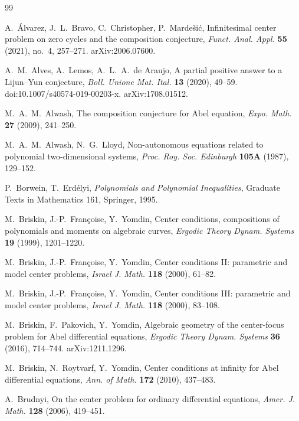 \documentclass[11pt]{article}
\theoremstyle{plain}
\theoremstyle{definition}
\theoremstyle{remark}
\begin{document}
\begin{thebibliography}{99}

A.~Álvarez, J.~L.~Bravo, C.~Christopher, P.~Mardešić,
Infinitesimal center problem on zero cycles and the composition conjecture,
\emph{Funct. Anal. Appl.} \textbf{55} (2021), no.~4, 257--271.
arXiv:2006.07600.

A.~M.~Alves, A.~Lemos, A.~L.~A.~de Araujo,
A partial positive answer to a Lijun--Yun conjecture,
\emph{Boll. Unione Mat. Ital.} \textbf{13} (2020), 49--59.
doi:10.1007/s40574-019-00203-x. arXiv:1708.01512.

M.~A.~M.~Alwash,
The composition conjecture for Abel equation,
\emph{Expo. Math.} \textbf{27} (2009), 241--250.

M.~A.~M.~Alwash, N.~G.~Lloyd,
Non-autonomous equations related to polynomial two-dimensional systems,
\emph{Proc. Roy. Soc. Edinburgh} \textbf{105A} (1987), 129--152.

P.~Borwein, T.~Erdélyi,
\emph{Polynomials and Polynomial Inequalities},
Graduate Texts in Mathematics 161, Springer, 1995.

M.~Briskin, J.-P.~Françoise, Y.~Yomdin,
Center conditions, compositions of polynomials and moments on algebraic curves,
\emph{Ergodic Theory Dynam. Systems} \textbf{19} (1999), 1201--1220.

M.~Briskin, J.-P.~Françoise, Y.~Yomdin,
Center conditions II: parametric and model center problems,
\emph{Israel J. Math.} \textbf{118} (2000), 61--82.

M.~Briskin, J.-P.~Françoise, Y.~Yomdin,
Center conditions III: parametric and model center problems,
\emph{Israel J. Math.} \textbf{118} (2000), 83--108.

M.~Briskin, F.~Pakovich, Y.~Yomdin,
Algebraic geometry of the center-focus problem for Abel differential equations,
\emph{Ergodic Theory Dynam. Systems} \textbf{36} (2016), 714--744.
arXiv:1211.1296.

M.~Briskin, N.~Roytvarf, Y.~Yomdin,
Center conditions at infinity for Abel differential equations,
\emph{Ann. of Math.} \textbf{172} (2010), 437--483.

A.~Brudnyi,
On the center problem for ordinary differential equations,
\emph{Amer. J. Math.} \textbf{128} (2006), 419--451.


\end{thebibliography}
\end{document}
